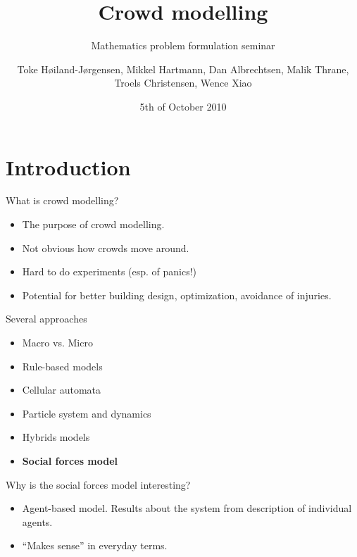 \documentclass{beamer}
\title{Crowd modelling}
\subtitle
{Mathematics problem formulation seminar} %
\author{Toke Høiland-Jørgensen, Mikkel Hartmann, Dan Albrechtsen, Malik 
Thrane, Troels Christensen, Wence Xiao}
\date{5th of October 2010}
\begin{document}
\begin{frame}
  \titlepage
\end{frame}


\section{Introduction}
\begin{frame}{What is crowd modelling?}
    \begin{itemize}
    	\item The purpose of crowd modelling.
        \item Not obvious how crowds move around.
        \item Hard to do experiments (esp. of panics!)
        \item Potential for better building design, optimization, avoidance of 
            injuries.
    \end{itemize}
\end{frame}

\begin{frame}{Several approaches}
    \begin{itemize}
    	\item Macro vs. Micro
        \item Rule-based models
        \item Cellular automata
        \item Particle system and dynamics
        \item Hybrids models
        \item \textbf{Social forces model}
    \end{itemize}
\end{frame}

\begin{frame}{Why is the social forces model interesting?}
    \begin{itemize}
        \item Agent-based model. Results about the system from description of 
            individual agents.
        \item ``Makes sense'' in everyday terms.
    \end{itemize}
\end{frame}
\end{document}
